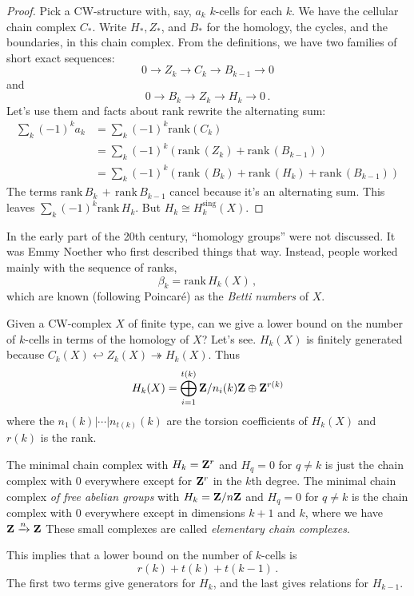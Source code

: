 \begin{proof}
Pick a CW-structure with, say, $a_k$ $k$-cells for each $k$. We have the 
cellular chain complex $C_*$. Write $H_*,Z_*$, and $B_*$ for the homology,
the cycles, and the boundaries, in this chain complex. From the definitions, 
we have two families of short exact sequences: 
\[
0\to Z_k\to C_k\to B_{k-1}\to 0
\]
and
\[
0\to B_k\to Z_k\to H_k\to 0\,.
\]
Let's use them and facts about rank rewrite the alternating sum:
\begin{align*}
\sum_k (-1)^ka_k & = \sum_k(-1)^k\mathrm{rank}(C_k)\\
& = \sum_k(-1)^k(\mathrm{rank}\,(Z_k)+\mathrm{rank}\,(B_{k-1}))\\
& = \sum_k(-1)^k(\mathrm{rank}\,(B_k)+\mathrm{rank}\,(H_k)+
\mathrm{rank}\,(B_{k-1}))
\end{align*}
The terms $\mathrm{rank}\,B_k\,+\,\mathrm{rank}\,B_{k-1}$ cancel because it's an alternating sum. This leaves $\sum_k(-1)^k\mathrm{rank}\,H_k$. But 
$H_k\cong H_k^\text{sing}(X)$.
\end{proof}

In the early part of the 20th century, ``homology groups'' were not discussed. 
It was Emmy Noether who first described things that way. Instead, 
people worked mainly with the sequence of ranks, 
\[
\beta_k=\mathrm{rank}\,H_k(X)\,,
\]
which are known (following Poincar\'e) as the {\em Betti numbers} of $X$.

Given a CW-complex $X$ of finite type, can we give a lower bound on the number of $k$-cells in terms of the homology of $X$? Let's see. $H_k(X)$ is finitely generated because $C_k(X)\hookleftarrow Z_k(X)\twoheadrightarrow H_k(X)$. Thus 
\[
H_k(X)=\bigoplus^{t(k)}_{i=1}\mathbf Z/n_i(k)\mathbf Z\oplus \mathbf Z^{r(k)}
\]
where the $n_1(k)|\cdots|n_{t(k)}(k)$ are the torsion coefficients of $H_k(X)$ 
and $r(k)$ is the rank.

The minimal chain complex with $H_k=\mathbf Z^r$ and $H_q=0$ for $q\neq k$ is just the chain complex with $0$ everywhere except for $\mathbf Z^r$ in the $k$th degree. The minimal chain complex {\em of free abelian groups} with $ H_k=\mathbf Z/n\mathbf Z$ and $ H_q=0$ for $q\neq k$ is the chain complex with $0$ everywhere except in dimensions $k+1$ and $k$, where we have $\mathbf Z\xrightarrow{n}\mathbf Z$ 
These small complexes are called {\em elementary chain complexes}.

This implies that a lower bound on the number of $k$-cells is 
\[
r(k)+t(k)+t(k-1)\,.
\]
The first two terms give generators for $H_k$, and the last gives relations
for $H_{k-1}$.

